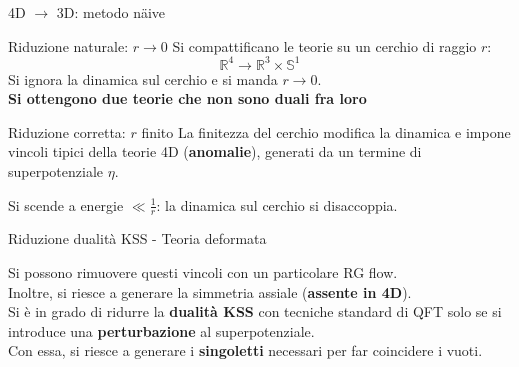 \documentclass[10pt,compress,usenames,dvipsnames]{beamer}
\begin{document}
\begin{frame}{4D $ \longrightarrow $ 3D: metodo n\"{a}ive}
\vspace{-0.5cm}
\begin{block}{Riduzione naturale: $r \rightarrow 0$}
Si compattificano le teorie su un cerchio di raggio $r$: $$\mathbb{R}^4 \longrightarrow \mathbb{R}^3 \times \mathbb{S}^1$$
Si ignora la dinamica sul cerchio e si manda $r \rightarrow 0$.\\
\alert{\bfseries  Si ottengono due teorie che non sono duali fra loro}
\end{block}

\begin{block}{Riduzione corretta: $r$ finito}
La finitezza del cerchio modifica la dinamica e impone vincoli tipici della teorie 4D (\alert{\bfseries anomalie}), generati da un termine di superpotenziale $\eta$.\\

\end{block}
Si scende a energie $\ll \frac{1}{r}$: la dinamica sul cerchio si disaccoppia.
\end{frame}



\begin{frame}{Riduzione dualità KSS - Teoria deformata}

Si possono rimuovere questi vincoli con un particolare RG flow.\\
Inoltre, si riesce a generare la simmetria assiale (\alert{\bfseries assente in 4D}).
\\
\vspace{0,6cm}
Si è in grado di ridurre la \alert{\bfseries dualità KSS} con tecniche standard di QFT solo se si introduce una \alert{\bfseries perturbazione} al superpotenziale.\\[0,2cm]
Con essa, si riesce a generare i \alert{\bfseries singoletti} necessari per far coincidere i vuoti.
\\
\vspace{0,3cm}
\end{frame}
\end{document}
